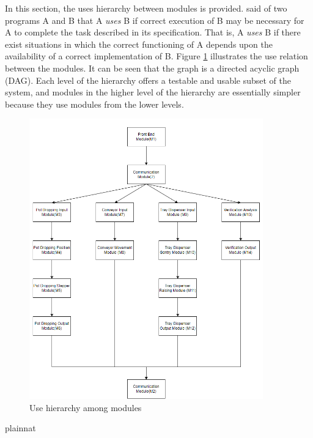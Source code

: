 \documentclass[12pt, titlepage]{article}
\begin{document}
In this section, the uses hierarchy between modules is
provided. \citet{Parnas1978} said of two programs A and B that A {\em uses} B if
correct execution of B may be necessary for A to complete the task described in
its specification. That is, A {\em uses} B if there exist situations in which
the correct functioning of A depends upon the availability of a correct
implementation of B.  Figure \ref{FigUH} illustrates the use relation between
the modules. It can be seen that the graph is a directed acyclic graph
(DAG). Each level of the hierarchy offers a testable and usable subset of the
system, and modules in the higher level of the hierarchy are essentially simpler
because they use modules from the lower levels.

\begin{figure}[H]
\centering
\includegraphics[width=0.9\textwidth]{ModuleGuide.png}
\caption{Use hierarchy among modules}
\label{FigUH}
\end{figure}


 {plainnat}


\newpage{}
\end{document}
